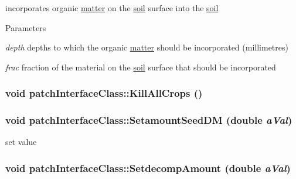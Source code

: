 incorporates organic \hyperlink{classmatter}{matter} on the \hyperlink{classsoil}{soil} surface into the \hyperlink{classsoil}{soil} 
\begin{DoxyParams}{Parameters}
\item[{\em depth}]depths to which the organic \hyperlink{classmatter}{matter} should be incorporated (millimetres) \item[{\em frac}]fraction of the material on the \hyperlink{classsoil}{soil} surface that should be incorporated \end{DoxyParams}
\hypertarget{classpatch_interface_class_a4f9fe24cb768ecc904cef91dd332f93f}{
\subsubsection[{KillAllCrops}]{\setlength{\rightskip}{0pt plus 5cm}void patchInterfaceClass::KillAllCrops ()}}
\label{classpatch_interface_class_a4f9fe24cb768ecc904cef91dd332f93f}
\hypertarget{classpatch_interface_class_a265236cfd0782d2d4bc3284a6ad95ba9}{
\subsubsection[{SetamountSeedDM}]{\setlength{\rightskip}{0pt plus 5cm}void patchInterfaceClass::SetamountSeedDM (double {\em aVal})}}
\label{classpatch_interface_class_a265236cfd0782d2d4bc3284a6ad95ba9}


set value \hypertarget{classpatch_interface_class_aa9d2da459f2fc40f4a9cae8dbe41cba6}{
\subsubsection[{SetdecompAmount}]{\setlength{\rightskip}{0pt plus 5cm}void patchInterfaceClass::SetdecompAmount (double {\em aVal})}}
\label{classpatch_interface_class_aa9d2da459f2fc40f4a9cae8dbe41cba6}


